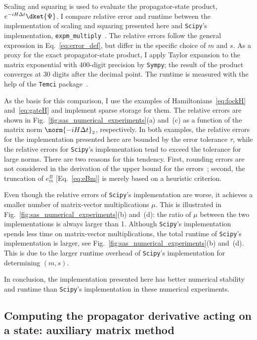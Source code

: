 Scaling and squaring is used to evaluate the propagator-state product, $e^{-iH\Delta t }\dket{\Psi}$. I compare relative error and runtime between the implementation of scaling and squaring presented here and \texttt{Scipy}'s implementation, \texttt{expm\_multiply}~\cite{al2011computing}. The relative errors follow the general expression in Eq.~\eqref{eq:error_def}, but differ in the specific choice of $m$ and $s$. As a proxy for the exact propagator-state product, I apply Taylor expansion to the matrix exponential with 400-digit precision by \texttt{Sympy}; the result of the product converges at 30 digits after the decimal point. The runtime is measured with the help of the \texttt{Temci} package~\cite{temci}.

As the basis for this comparison, I use the examples of Hamiltonians~\eqref{eq:fockH} and~\eqref{eq:gateH} and implement sparse storage for them. The relative errors are shown in Fig.~\ref{fig:sas_numerical_experiments}(a) and~(c) as a function of the matrix norm $\norm{-iH\Delta t}_2$, respectively. In both examples, the relative errors for the implementation presented here are bounded by the error tolerance $\tau$, while the relative errors for \texttt{Scipy}'s implementation tend to exceed the tolerance for large norms. There are two reasons for this tendency. First, rounding errors are not considered in the derivation of the upper bound for the errors~\cite{al2011computing}; second, the truncation of $e^B_m$ [Eq.~\eqref{eq:eBm}] is merely based on a heuristic criterion. 

Even though the relative errors of \texttt{Scipy}'s implementation are worse, it achieves a smaller number of matrix-vector multiplications $\mu$. This is illustrated in Fig.~\ref{fig:sas_numerical_experiments}(b) and~(d): the ratio of $\mu$ between the two implementations is always larger than 1. Although \texttt{Scipy}'s implementation spends less time on matrix-vector multiplications, the total runtime of \texttt{Scipy}'s implementation is larger, see Fig.~\ref{fig:sas_numerical_experiments}(b) and~(d). This is due to the larger runtime overhead of \texttt{Scipy}'s implementation for determining $(m,s)$. 

In conclusion, the implementation presented here has better numerical stability and runtime than \texttt{Scipy}'s implementation in these numerical experiments. 


\subsection{Computing the propagator derivative acting on a state: auxiliary matrix method}
\label{sec:auxiliary_matrix}

